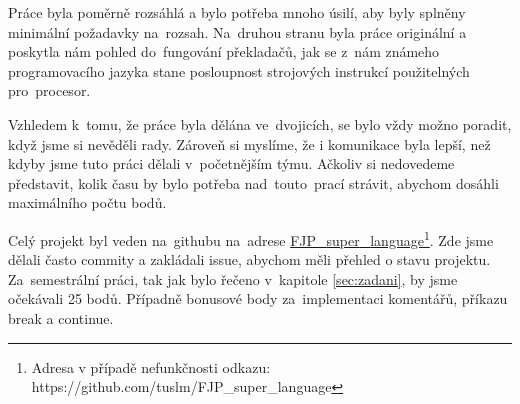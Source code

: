 \documentclass[czech]{thesiskiv}
\begin{document}
Práce byla poměrně rozsáhlá a bylo potřeba mnoho úsilí, aby byly splněny minimální požadavky na~rozsah.
Na~druhou stranu byla práce originální a poskytla nám pohled do~fungování překladačů,
jak se z~nám známeho programovacího jazyka stane posloupnost strojových instrukcí použitelných pro~procesor.

Vzhledem k~tomu, že práce byla dělána ve~dvojicích, se bylo vždy možno poradit, když jsme si nevěděli rady.
Zároveň si myslíme, že i komunikace byla lepší, než kdyby jsme tuto práci dělali v~početnějším týmu.
Ačkoliv si nedovedeme představit, kolik času by bylo potřeba nad~touto~prací strávit, abychom dosáhli maximálního počtu bodů.

Celý projekt byl veden na~githubu na~adrese \href{https://github.com/tuslm/FJP\_{super}\_{language}}{FJP\_{super}\_{language}}\footnote{Adresa v případě nefunkčnosti odkazu: https://github.com/tuslm/FJP\_{super}\_{language}}.
Zde jsme dělali často commity a zakládali issue, abychom měli přehled o stavu projektu.
Za~semestrální práci, tak jak bylo řečeno v~kapitole \ref{sec:zadani}, by jsme očekávali 25 bodů. Případně
bonusové body za~implementaci komentářů, příkazu break a continue.
\end{document}
